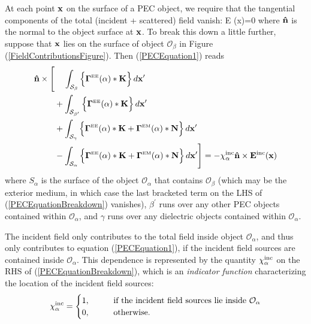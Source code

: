 \documentclass[dvips,letterpaper]{article}
\begin{document}
At each point $\mathbf{x}$ on the surface of a PEC object,
we require that the tangential components of the 
total (incident + scattered) field vanish:
{ \times \vb E (\vb x)=0 
}
where $\mathbf{\hat n}$ is the normal to the object surface
at $\mathbf{x}$. 
To break this down a little further, suppose that $\mathbf{x}$
lies on the surface of object $\mathcal{O}_\beta$ in
Figure (\ref{FieldContributionsFigure}). Then (\ref{PECEquation1}) 
reads
\begin{align}
\mathbf{\hat n}\times
 \Bigg[  &\hphantom{+}\,\,\int_{\mathcal{S_\beta}} 
           \Big\{ \boldsymbol{\Gamma}^{\hbox{\tiny{EE}}}(\alpha)*\mathbf{K} \Big\} \, d\mathbf{x}^\prime
\nonumber \\
         &+\int_{\mathcal{S_{\beta^\prime}}} 
           \Big\{ \boldsymbol{\Gamma}^{\hbox{\tiny{EE}}}(\alpha)*\mathbf{K} \Big\} \, d\mathbf{x}^\prime
\nonumber \\
         &+\int_{\mathcal{S_\gamma}} 
           \Big\{ \boldsymbol{\Gamma}^{\hbox{\tiny{EE}}}(\alpha)*\mathbf{K} 
                 +\boldsymbol{\Gamma}^{\hbox{\tiny{EM}}}(\alpha)*\mathbf{N} \Big\} \, d\mathbf{x}^\prime
\nonumber \\
         &-\int_{\mathcal{S_\alpha}} 
           \Big\{ \boldsymbol{\Gamma}^{\hbox{\tiny{EE}}}(\alpha)*\mathbf{K} 
                 +\boldsymbol{\Gamma}^{\hbox{\tiny{EM}}}(\alpha)*\mathbf{N} \Big\} \, d\mathbf{x}^\prime
 \Bigg]
= -\chi^{\hbox{\scriptsize{inc}}}_\alpha \mathbf{\hat n}\times \mathbf{E}^{\hbox{\scriptsize{inc}}}(\mathbf{x})
\label{PECEquationBreakdown}
\end{align}
where $S_\alpha$ is the surface of the object $\mathcal{O}_\alpha$ 
that contains $\mathcal{O}_\beta$ (which may be the exterior medium, 
in which case the last bracketed term on the LHS 
of (\ref{PECEquationBreakdown}) vanishes),
$\beta^\prime$ runs over any other PEC objects contained
within $\mathcal{O}_\alpha$, and $\gamma$ runs over
any dielectric objects contained within 
$\mathcal{O}_\alpha$.

The incident field only contributes to the total field
inside object $\mathcal{O}_\alpha$, 
and thus only contributes to equation (\ref{PECEquation1}),
if the incident field sources are contained inside 
$\mathcal{O}_\alpha$. This dependence is represented by the 
quantity $\chi^{\hbox{\scriptsize{inc}}}_\alpha$ on the RHS of 
(\ref{PECEquationBreakdown}), which is an 
\textit{indicator function} characterizing the location of 
the incident field sources:
$$
 \chi^{\hbox{\scriptsize{inc}}}_\alpha
 =\begin{cases} 
    1, \qquad &\text{if the incident field sources lie inside 
                      $\mathcal{O}_\alpha$} \\
    0, \qquad &\text{otherwise.}
  \end{cases} 
$$
\end{document}
